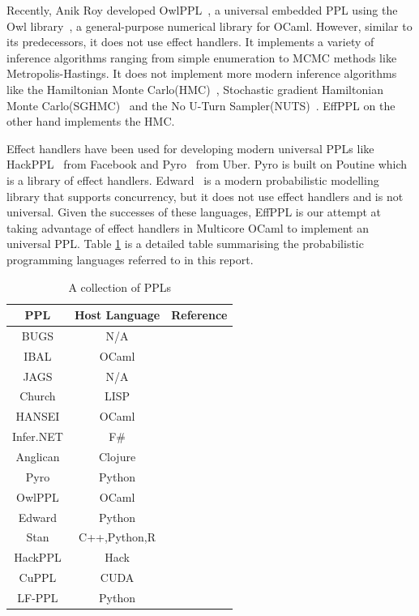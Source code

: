 \documentclass[a4paper,11pt]{article}
\theoremstyle{mytheor}
\begin{document}
Recently, Anik Roy developed OwlPPL~\cite{roy2020probabilistic}, a universal embedded PPL using the Owl library~\cite{wang2018owl}, a general-purpose numerical library for OCaml. However, similar to its predecessors, it does not use effect handlers. It implements a variety of inference algorithms ranging from simple enumeration to MCMC methods like Metropolis-Hastings. It does not implement more modern inference algorithms like the Hamiltonian Monte Carlo(HMC)~\cite{betancourt2018conceptual}, Stochastic gradient Hamiltonian Monte Carlo(SGHMC)~\cite{sghmc} and the No U-Turn Sampler(NUTS)~\cite{hoffman2011nouturn}. EffPPL on the other hand implements the HMC.  

 Effect handlers have been used for developing modern universal PPLs like HackPPL~\cite{hack} from Facebook and Pyro~\cite{pyro} from Uber. Pyro is built on Poutine which is a library of effect handlers. Edward~\cite{tran2017deep} is a modern probabilistic modelling library that supports concurrency, but it does not use effect handlers and is not universal. Given the successes of these languages, EffPPL is our attempt at taking advantage of effect handlers in Multicore OCaml to implement an universal PPL. Table \ref{ppls} is a detailed table summarising the probabilistic programming languages referred to in this report.

\begin{table}[H]
	\centering
    \caption{A collection of PPLs}
	\begin{tabular}{|c|c|c|}
		\toprule
		PPL & Host Language & Reference \\	
		\midrule
		\midrule
		BUGS        & N/A               & ~\cite{gilks1994language} \\
		IBAL        & OCaml             &  ~\cite{IBAL} \\
		JAGS        & N/A               &  ~\cite{jags} \\
		Church      & LISP              &  ~\cite{goodman2012church} \\
		HANSEI      & OCaml             &  ~\cite{Hansei}\\
		Infer.NET   & F\#               &  ~\cite{wang2011using} \\
		Anglican    & Clojure           &  ~\cite{tolpin2016design} \\
		Pyro        & Python            & ~\cite{pyro}  \\
		OwlPPL      & OCaml             &  ~\cite{roy2020probabilistic} \\
		Edward  	& Python            &   ~\cite{tran2017deep}\\
		Stan    	& C++,Python,R      &  ~\cite{stan}\\
		HackPPL		& Hack				& ~\cite{hack} \\
		CuPPL       & CUDA 				& ~\cite{collins2020probabilistic} \\
		LF-PPL 		& Python 			& ~\cite{zhou2019lfppl} \\
		\bottomrule
	\end{tabular}
	\label{ppls}
\end{table}
\end{document}
